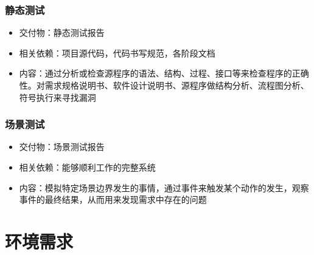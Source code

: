 \documentclass[hyperref, a4paper]{ctexart}
\providecommand{\tightlist}{%
  \setlength{\itemsep}{0pt}\setlength{\parskip}{0pt}}
\begin{document}
\hypertarget{ux9759ux6001ux6d4bux8bd5}{%
\subsubsection{静态测试}\label{ux9759ux6001ux6d4bux8bd5}}

\begin{itemize}
\tightlist
\item
  交付物：静态测试报告
\item
  相关依赖：项目源代码，代码书写规范，各阶段文档
\item
  内容：通过分析或检查源程序的语法、结构、过程、接口等来检查程序的正确性。对需求规格说明书、软件设计说明书、源程序做结构分析、流程图分析、符号执行来寻找漏洞
\end{itemize}

\hypertarget{ux573aux666fux6d4bux8bd5}{%
\subsubsection{场景测试}\label{ux573aux666fux6d4bux8bd5}}

\begin{itemize}
\tightlist
\item
  交付物：场景测试报告
\item
  相关依赖：能够顺利工作的完整系统
\item
  内容：模拟特定场景边界发生的事情，通过事件来触发某个动作的发生，观察事件的最终结果，从而用来发现需求中存在的问题
\end{itemize}

\hypertarget{ux73afux5883ux9700ux6c42}{%
\section{环境需求}\label{ux73afux5883ux9700ux6c42}}
\end{document}
